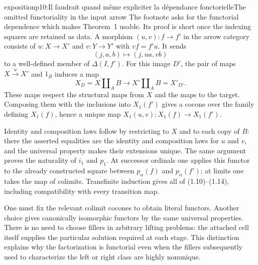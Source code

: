 \begin{dcomment}{exposition}{p10:Il faudrait quand même expliciter la dépendance fonctorielle}{The omitted functoriality in the input arrow}
The footnote asks for the functorial dependence which makes Theorem~1 usable. Its proof is short once the indexing squares are retained as data. A morphism $(u,v):f\to f'$ in the arrow category consists of $u:X\to X'$ and $v:Y\to Y'$ with $vf=f'u$. It sends
\[
 (j,a,b)\longmapsto(j,ua,vb)
\]
to a well-defined member of $\Delta(I,f')$. For this image $D'$, the pair of maps $X\xrightarrow{u}X'$ and $1_B$ induces a map
\[
 X_D=X\amalg_A B\longrightarrow X'\amalg_A B=X'_{D'}.
\]
These maps respect the structural maps from $X$ and the maps to the target. Composing them with the inclusions into $X_1(f')$ gives a cocone over the family defining $X_1(f)$, hence a unique map $X_1(u,v):X_1(f)\to X_1(f')$.

Identity and composition laws follow by restricting to $X$ and to each copy of $B$: there the asserted equalities are the identity and composition laws for $u$ and $v$, and the universal property makes their extensions unique. The same argument proves the naturality of $i_1$ and $p_1$. At successor ordinals one applies this functor to the already constructed square between $p_\alpha(f)$ and $p_\alpha(f')$; at limits one takes the map of colimits. Transfinite induction gives all of (1.10)--(1.14), including compatibility with every transition map.

One must fix the relevant colimit cocones to obtain literal functors. Another choice gives canonically isomorphic functors by the same universal properties. There is no need to choose fillers in arbitrary lifting problems: the attached cell itself supplies the particular solution required at each stage. This distinction explains why the factorization is functorial even when the fillers subsequently used to characterize the left or right class are highly nonunique.
\end{dcomment}

